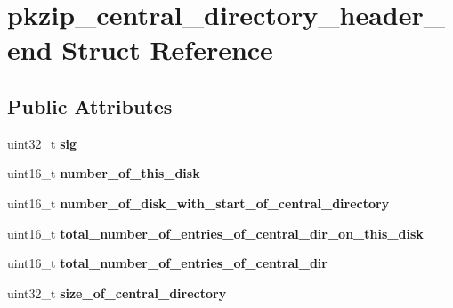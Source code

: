 \hypertarget{structpkzip__central__directory__header__end}{\section{pkzip\-\_\-central\-\_\-directory\-\_\-header\-\_\-end Struct Reference}
\label{structpkzip__central__directory__header__end}
}
\subsection*{Public Attributes}
\begin{DoxyCompactItemize}
\item 
\hypertarget{structpkzip__central__directory__header__end_ad361f15e10bfbfa61571a07fc1ade8ce}{uint32\-\_\-t {\bfseries sig}}\label{structpkzip__central__directory__header__end_ad361f15e10bfbfa61571a07fc1ade8ce}

\item 
\hypertarget{structpkzip__central__directory__header__end_ae4270bca91f2c152f83f0dc6c42d29da}{uint16\-\_\-t {\bfseries number\-\_\-of\-\_\-this\-\_\-disk}}\label{structpkzip__central__directory__header__end_ae4270bca91f2c152f83f0dc6c42d29da}

\item 
\hypertarget{structpkzip__central__directory__header__end_a9e3d62d98cd027f467ddc195deb091b3}{uint16\-\_\-t {\bfseries number\-\_\-of\-\_\-disk\-\_\-with\-\_\-start\-\_\-of\-\_\-central\-\_\-directory}}\label{structpkzip__central__directory__header__end_a9e3d62d98cd027f467ddc195deb091b3}

\item 
\hypertarget{structpkzip__central__directory__header__end_abc91469276c73a96df30bc7f2a7f7615}{uint16\-\_\-t {\bfseries total\-\_\-number\-\_\-of\-\_\-entries\-\_\-of\-\_\-central\-\_\-dir\-\_\-on\-\_\-this\-\_\-disk}}\label{structpkzip__central__directory__header__end_abc91469276c73a96df30bc7f2a7f7615}

\item 
\hypertarget{structpkzip__central__directory__header__end_ac7cfe1c3aa5415dd498b524a4f200839}{uint16\-\_\-t {\bfseries total\-\_\-number\-\_\-of\-\_\-entries\-\_\-of\-\_\-central\-\_\-dir}}\label{structpkzip__central__directory__header__end_ac7cfe1c3aa5415dd498b524a4f200839}

\item 
\hypertarget{structpkzip__central__directory__header__end_a6e4d85127b1ce17f4302f83fd9de8bac}{uint32\-\_\-t {\bfseries size\-\_\-of\-\_\-central\-\_\-directory}}\label{structpkzip__central__directory__header__end_a6e4d85127b1ce17f4302f83fd9de8bac}


\end{DoxyCompactItemize}
